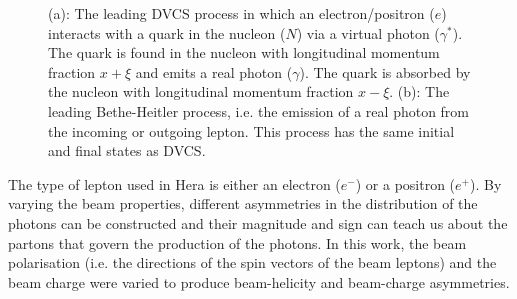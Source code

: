 \documentclass[11pt]{article}
\begin{document}
\begin{figure}
\begin{center}
\caption[DVCS and Bethe Heitler hand bag diagram.]{(a): The leading DVCS process in which an electron/positron ($e$) interacts with a quark in the nucleon
($N$) via a virtual photon ($\gamma^\ast$). The quark is found in the
nucleon with longitudinal momentum fraction $x+\xi$ and emits a real
photon ($\gamma$). The quark is absorbed by the nucleon with
longitudinal momentum fraction $x-\xi$. (b): The leading Bethe-Heitler process, i.e. the emission of a real photon from the incoming or outgoing lepton. This process has the same initial and final states as DVCS.}
\label{spin}
\end{center}
\end{figure}

The type of lepton used in H{\sc era} is either an electron ($e^-$) or a positron ($e^+$). By varying the beam properties, different asymmetries in the distribution of the photons can be constructed and their magnitude and sign can teach us about the partons that govern the production of the photons. In this work, the beam polarisation (i.e. the directions of the spin vectors of the beam leptons) and the beam charge were varied to produce beam-helicity and beam-charge asymmetries.
\end{document}
